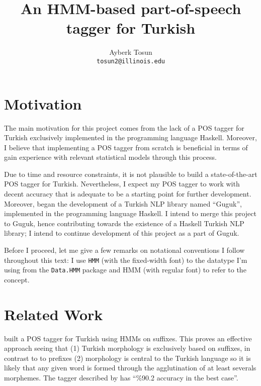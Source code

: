 \documentclass{article}
\title{\bf An HMM-based part-of-speech tagger for Turkish}
\author{Ayberk Tosun\\\texttt{tosun2@illinois.edu}}
\date{}
\begin{document}
\maketitle

\section{Motivation}
\label{sec:motivation}

The main motivation for this project comes from the lack of a POS tagger for
Turkish exclusively implemented in the programming language Haskell. Moreover, I
believe that implementing a POS tagger from scratch is beneficial in terms of
gain experience with relevant statistical models through this process.

Due to time and resource constraints, it is not plausible to build a
state-of-the-art POS tagger for Turkish. Nevertheless, I expect my POS tagger to
work with decent accuracy that is adequate to be a starting point for further
development. Moreover, \citet{Korkut2015} began the development of a Turkish NLP
library named ``Guguk'', implemented in the programming language Haskell. I
intend to merge this project to Guguk, hence contributing towards the existence
of a Haskell Turkish NLP library; I intend to continue development of this
project as a part of Guguk.

Before I proceed, let me give a few remarks on notational conventions I follow
throughout this text: I use \texttt{HMM} (with the fixed-width font) to the
datatype I'm using from the \texttt{Data.HMM} package and HMM (with regular
font) to refer to the concept.

\section{Related Work}
\label{sec:related_work}

\cite{dincer2008suffix} built a POS tagger for Turkish using HMMs on suffixes.
This proves an effective approach seeing that (1) Turkish morphology is
exclusively based on suffixes, in contrast to to prefixes (2) morphology is
central to the Turkish language so it is likely that any given word is formed
through the agglutination of at least severals morphemes. The tagger described
by \citet{dincer2008suffix} has ``\%90.2 accuracy in the best case''.
\end{document}
